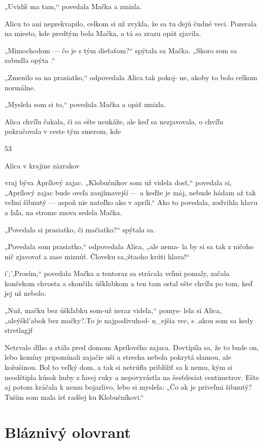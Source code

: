\documentclass[12pt]{article}
\begin{document}
\begin{Parallel}[p]{}{}
{{„Uvidíš ma tam,“ povedala Mačka a zmizla.

Alicu to ani neprekvapilo, celkom si už zvykla, že sa tu
dejú čudné veci. Pozerala na miesto, kde predtým bola
Mačka, a tá sa zrazu opät zjavila.

„Mimochodom — čo je s tým dieťaťom?“ spýtala sa
Mačka. „Skoro som sa zabudla opýta .“

„Zmenilo sa na prasiatko,“ odpovedala Alica tak pokoj-
ne, akoby to bolo celkom normálne.

„Myslela som si to,“ povedala Mačka a opäť zmizla.

Alica chvíľu čakala, či sa ešte neukáže, ale keď sa
nezjavovala, o chvíľu pokračovala v ceste tým smerom, kde

53

 

 

 

 

Alica v krajine zázrakov

vraj býva Aprílový zajac. „Klobučníkov som už videla
dosť,“ povedala si, „Aprílový zajac bude oveľa zaujímavejší
— a keďže je máj, nebude hádam až tak veľmi šibnutý
— aspoň nie natoľko ako v apríli.“ Ako to povedala,
zodvihla hlavu a ľaľa, na strome znova sedela Mačka.

„Povedala si prasiatko, či mačiatko?“ spýtala sa.

„Povedala som prasiatko,“ odpovedala Alica, „ale nema-
la by si sa tak z ničoho nič zjavovať a zase miznúť. Človeku
sa,;štaoho krúti hlava!“

i';',Prosím,“ povedala Mačka a tentoraz sa strácala veľmi
pomaly, začala končekom chvosta a skončila úškľabkom
a ten tam ostal ešte chvíľu po tom, keď jej už nebolo.

„Nuž, mačku bez úškľabku som-už neraz videla,“ pomys-
lela si Alica, „aleýškl'abok bez mačky?.To je najpodivuhod-
n_ejšia vec, s .akou som sa kedy stretlagjf

Netrvalo dlho a stála pred domom Aprílového zajaca.
Dovtípila sa, že to bude on, lebo komíny pripomínali zajačie
uši a strecha nebola pokrytá slamou, ale kožušinou. Bol to
veľký dom, a tak si netrúfla priblížiť sa k nemu, kým si
neodštipla kúsok huby z ľavej ruky a nepovyrástla na
šesťdesiat centimetrov. Ešte aj potom kráčala k nemu
bojazlivo, lebo si myslela: „Čo ak je priveľmi šibnutý?
Tuším som mala ísť radšej ku Klobučníkovi.“

\section{Bláznivý olovrant}

}}
\end{Parallel}
\end{document}
